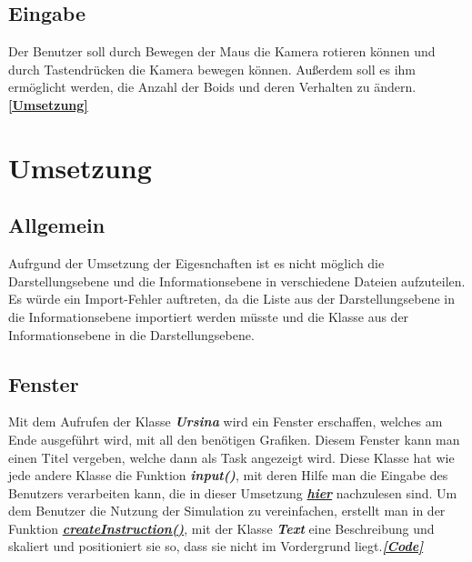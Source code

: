 \documentclass[a4paper, hidelinks, 12pt]{article}
\begin{document}
\subsection{Eingabe}
Der Benutzer soll durch Bewegen der Maus die Kamera rotieren können und durch Tastendrücken die Kamera bewegen können. Außerdem soll es ihm ermöglicht werden, die Anzahl der Boids und deren Verhalten zu ändern.\hyperref[Umsetzunginput]{\textbf{[Umsetzung]}}
\newpage
	
	
	
\section{Umsetzung}
\subsection{Allgemein}
Aufrgund der Umsetzung der Eigesnchaften ist es nicht möglich die Darstellungsebene und die Informationsebene in verschiedene Dateien aufzuteilen. Es würde ein Import-Fehler auftreten, da die Liste aus der Darstellungsebene in die Informationsebene importiert werden müsste und die Klasse aus der Informationsebene in die Darstellungsebene.
	
\subsection{Fenster}\label{UmsetzungFenster}
Mit dem Aufrufen der Klasse \textbf{\emph{Ursina}}\cite{2022m} wird ein Fenster erschaffen, welches am Ende ausgeführt wird, mit all den benötigen Grafiken\cite{2022q}. Diesem Fenster kann man einen Titel vergeben, welche dann als Task angezeigt wird\cite{2022q}. Diese Klasse hat wie jede andere Klasse\cite{2022} die Funktion \textbf{\emph{input()}}, mit deren Hilfe man die Eingabe des Benutzers verarbeiten kann, die in dieser Umsetzung \hyperref[Umsetzunginput]{\textbf{\emph{hier}}} nachzulesen sind. Um dem Benutzer die Nutzung der Simulation zu vereinfachen, erstellt man in der Funktion \hyperref[CodeCreateInstructions]{\textbf{\emph{createInstruction()}}}, mit der Klasse \textbf{\emph{Text}} eine Beschreibung und skaliert und positioniert sie so, dass sie nicht im Vordergrund liegt\cite{Takeru2022}.\hyperref[CodeFenster]{\textbf{\emph{[Code]}}}
\end{document}
